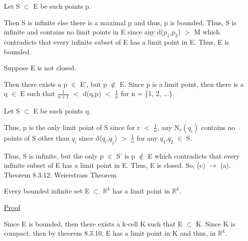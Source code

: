 	Let S $\subset$ E be such points p.
	
	Then S is infinite else there is a maximal p and thus,
	p is bounded.
	Thus, S is infinite and contains no limit points in E
	since any d($p_1$,$p_2$) $>$ M which contradicts that
	every infinite subset of E has a limit point in E.
	Thus, E is bounded.

	Suppose E is not closed.

	Then there exists a p $\in$ E', but p $\not \in$ E.
	Since p is a limit point, then there is a
	q $\in$ E such that $\frac{1}{n+1}$ $<$ d(q,p) $<$ $\frac{1}{n}$
	for n = \{1, 2, ...\}.

	Let S $\subset$ E be such points q.

	Thus, p is the only limit point of S since for r $<$ $\frac{1}{n}$,
	any N$_r(q_i)$ contains no points of S other than $q_i$ since
	d($q_i$,$q_j$) $>$ $\frac{1}{n}$ for any $q_1$,$q_2$ $\in$ S.
	
	Thus, S is infinite, but the only p $\in$ S' is p $\not \in$ E
	which contradicts that every infinite subset of E has a
	limit point in E. Thus, E is closed. So, (c) $\rightarrow$ (a). \\

{ \color{red} Theorem 8.3.12: Weierstrass Theorem } 

	\begin{adjustbox}{minipage=14cm, right, vspace=0.1cm 0cm}
		Every bounded infinite set E $\subset$ $\mathbb{R}^k$ has
		a limit point in $\mathbb{R}^k$.
	\end{adjustbox}

{ \color{magenta} \underline{Proof} } 

	Since E is bounded, then there exists a k-cell K such that
	E $\subset$ K.
	Since K is compact, then by {\color{red} theorem 8.3.10},
	E has a limit point in K and thus, in $\mathbb{R}^k$.





